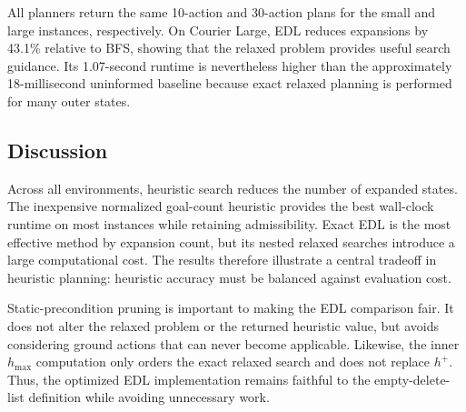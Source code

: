 All planners return the same 10-action and 30-action plans for the small and
large instances, respectively.  On Courier Large, EDL reduces expansions by
43.1\% relative to BFS, showing that the relaxed problem provides useful search
guidance.  Its 1.07-second runtime is nevertheless higher than the approximately
18-millisecond uninformed baseline because exact relaxed planning is performed
for many outer states.

\subsection{Discussion}

Across all environments, heuristic search reduces the number of expanded states.
The inexpensive normalized goal-count heuristic provides the best wall-clock
runtime on most instances while retaining admissibility.  Exact EDL is the most
effective method by expansion count, but its nested relaxed searches introduce
a large computational cost.  The results therefore illustrate a central
tradeoff in heuristic planning: heuristic accuracy must be balanced against
evaluation cost.

Static-precondition pruning is important to making the EDL comparison fair.  It
does not alter the relaxed problem or the returned heuristic value, but avoids
considering ground actions that can never become applicable.  Likewise, the
inner $h_{\max}$ computation only orders the exact relaxed search and does not
replace $h^+$.  Thus, the optimized EDL implementation remains faithful to the
empty-delete-list definition while avoiding unnecessary work.
